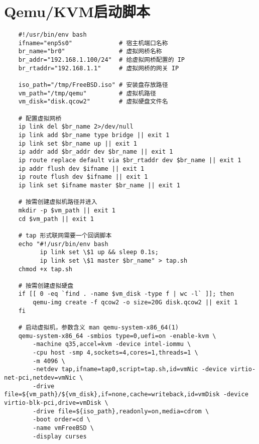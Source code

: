 \section{Qemu/KVM启动脚本}\label{ap:qemu}

\begin{lstlisting}
    #!/usr/bin/env bash
    ifname="enp5s0"             # 宿主机端口名称
    br_name="br0"               # 虚拟网桥名称
    br_addr="192.168.1.100/24"  # 给虚拟网桥配置的 IP
    br_rtaddr="192.168.1.1"     # 虚拟网桥的网关 IP

    iso_path="/tmp/FreeBSD.iso" # 安装盘存放路径
    vm_path="/tmp/qemu"         # 虚拟机路径
    vm_disk="disk.qcow2"        # 虚拟硬盘文件名

    # 配置虚拟网桥
    ip link del $br_name 2>/dev/null
    ip link add $br_name type bridge || exit 1
    ip link set $br_name up || exit 1
    ip addr add $br_addr dev $br_name || exit 1
    ip route replace default via $br_rtaddr dev $br_name || exit 1
    ip addr flush dev $ifname || exit 1
    ip route flush dev $ifname || exit 1
    ip link set $ifname master $br_name || exit 1

    # 按需创建虚拟机路径并进入
    mkdir -p $vm_path || exit 1
    cd $vm_path || exit 1

    # tap 形式联网需要一个回调脚本
    echo "#!/usr/bin/env bash
          ip link set \$1 up && sleep 0.1s;
          ip link set \$1 master $br_name" > tap.sh
    chmod +x tap.sh

    # 按需创建虚拟硬盘
    if [[ 0 -eq `find . -name $vm_disk -type f | wc -l` ]]; then
        qemu-img create -f qcow2 -o size=20G disk.qcow2 || exit 1
    fi

    # 启动虚拟机，参数含义 man qemu-system-x86_64(1)
    qemu-system-x86_64 -smbios type=0,uefi=on -enable-kvm \
        -machine q35,accel=kvm -device intel-iommu \
        -cpu host -smp 4,sockets=4,cores=1,threads=1 \
        -m 4096 \
        -netdev tap,ifname=tap0,script=tap.sh,id=vmNic -device virtio-net-pci,netdev=vmNic \
        -drive file=${vm_path}/${vm_disk},if=none,cache=writeback,id=vmDisk -device virtio-blk-pci,drive=vmDisk \
        -drive file=${iso_path},readonly=on,media=cdrom \
        -boot order=cd \
        -name vmFreeBSD \
        -display curses
\end{lstlisting}
